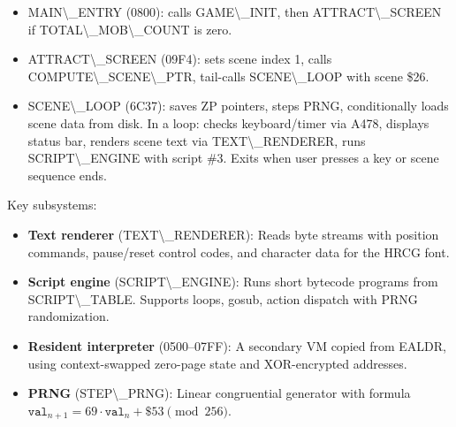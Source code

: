 \documentclass[10pt]{report}
\begin{document}
\begin{itemize}
  \item {\Tt{}MAIN{\textbackslash}{\_}ENTRY\nwendquote} ({\Tt{}{\textbackslash}{\$}0800\nwendquote}): calls {\Tt{}GAME{\textbackslash}{\_}INIT\nwendquote}, then
        {\Tt{}ATTRACT{\textbackslash}{\_}SCREEN\nwendquote} if {\Tt{}TOTAL{\textbackslash}{\_}MOB{\textbackslash}{\_}COUNT\nwendquote} is zero.
  \item {\Tt{}ATTRACT{\textbackslash}{\_}SCREEN\nwendquote} ({\Tt{}{\textbackslash}{\$}09F4\nwendquote}): sets scene index 1, calls
        {\Tt{}COMPUTE{\textbackslash}{\_}SCENE{\textbackslash}{\_}PTR\nwendquote}, tail-calls {\Tt{}SCENE{\textbackslash}{\_}LOOP\nwendquote} with scene \$26.
  \item {\Tt{}SCENE{\textbackslash}{\_}LOOP\nwendquote} ({\Tt{}{\textbackslash}{\$}6C37\nwendquote}): saves ZP pointers, steps PRNG,
        conditionally loads scene data from disk.  In a loop: checks
        keyboard/timer via {\Tt{}{\textbackslash}{\$}A478\nwendquote}, displays status bar, renders scene
        text via {\Tt{}TEXT{\textbackslash}{\_}RENDERER\nwendquote}, runs {\Tt{}SCRIPT{\textbackslash}{\_}ENGINE\nwendquote} with script \#3.
        Exits when user presses a key or scene sequence ends.
\end{itemize}

Key subsystems:
\begin{itemize}
  \item \textbf{Text renderer} ({\Tt{}TEXT{\textbackslash}{\_}RENDERER\nwendquote}): Reads byte streams with
        position commands, pause/reset control codes, and character data
        for the HRCG font.
  \item \textbf{Script engine} ({\Tt{}SCRIPT{\textbackslash}{\_}ENGINE\nwendquote}): Runs short bytecode
        programs from {\Tt{}SCRIPT{\textbackslash}{\_}TABLE\nwendquote}.  Supports loops, gosub, action
        dispatch with PRNG randomization.
  \item \textbf{Resident interpreter} ({\Tt{}{\textbackslash}{\$}0500\nwendquote}--{\Tt{}{\textbackslash}{\$}07FF\nwendquote}): A
        secondary VM copied from EALDR, using context-swapped zero-page
        state and XOR-encrypted addresses.
  \item \textbf{PRNG} ({\Tt{}STEP{\textbackslash}{\_}PRNG\nwendquote}): Linear congruential generator with
        formula $\texttt{val}_{n+1} = 69 \cdot \texttt{val}_n + \$53
        \pmod{256}$.
\end{itemize}
\end{document}
